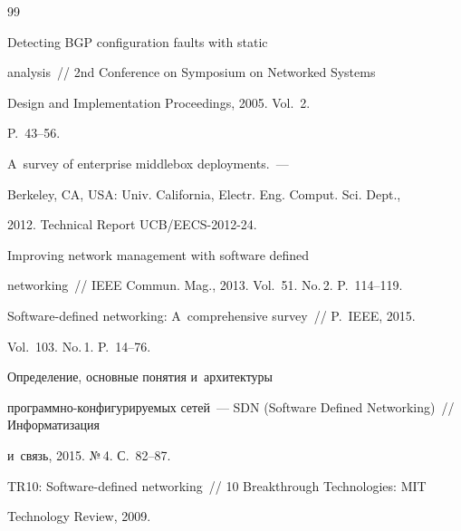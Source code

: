 {\small\frenchspacing


{%




\begin{thebibliography}{99}







 Detecting BGP configuration faults with static 


analysis~/\!\!/ 2nd Conference on Symposium on Networked Systems


Design and Implementation Proceedings, 2005. Vol.~2. 


P.~43--56.




 A~survey of enterprise middlebox deployments.~--- 


Berkeley, CA, USA: Univ. California, Electr. Eng. Comput. Sci. Dept., 


2012. Technical Report  UCB/EECS-2012-24.




 Improving network management with software defined 


networking~/\!\!/ IEEE Commun. Mag., 2013. Vol.~51. No.\,2. P.~114--119.






Software-defined networking: A~comprehensive survey~/\!\!/ P.~IEEE, 2015. 


Vol.~103. No.\,1. P.~14--76.







 Определение, основные понятия и~архитектуры 


про\-грам\-мно-кон\-фи\-гу\-ри\-ру\-емых сетей~--- SDN (Software Defined Networking)~/\!\!/ Информатизация 


и~связь, 2015. №\,4. С.~82--87.




 TR10: Software-defined networking~/\!\!/ 10 Breakthrough Technologies: MIT 


Technology Review, 2009. {\sf  


}
\end{thebibliography}}}
